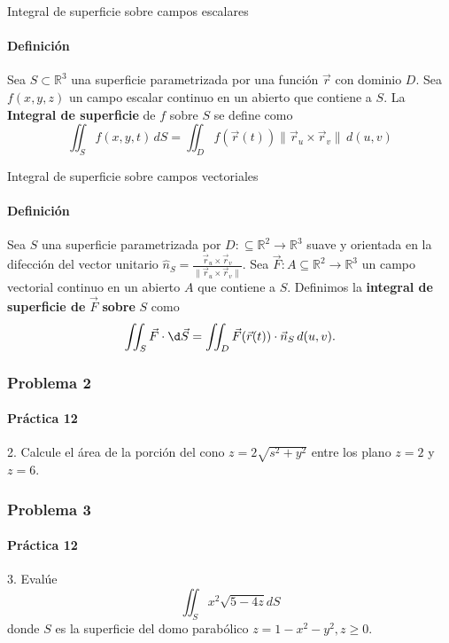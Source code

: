 \documentclass{plantillaPPT}
\begin{document}
\begin{frame}{Integral de superficie sobre campos escalares}
\framesubtitle{Definición}
\begin{definicion}
    Sea $S\subset\mathbb{R}^3$ una superficie parametrizada por una función $\vec{r}$ con dominio $D$. Sea $f(x,y,z)$ un campo escalar continuo en un abierto que contiene a $S$. La \textbf{Integral de superficie} de $f$ sobre $S$ se define como
    \begin{equation*}
        \iint_Sf(x,y,t)\,dS = \iint_Df(\vec{r}(t)) \|\vec{r}_u \times\vec{r}_v\|\,d(u,v)
    \end{equation*}
\end{definicion}
\end{frame}

\begin{frame}{Integral de superficie sobre campos vectoriales}
\framesubtitle{Definición}
\begin{definicion}
    Sea $S$ una superficie parametrizada por $D:\subseteq\mathbb{R}^2\to\mathbb{R}^3$ suave y orientada en la difección del vector unitario $\displaystyle\hat{n}_S = \frac{\vec{r}_u\times\vec{r}_v}{\|\vec{r}_u\times\vec{r}_v\|}$. Sea $\vec{F}:A\subseteq\mathbb{R}^2\to\mathbb{R}^3$ un campo vectorial continuo en un abierto $A$ que contiene a $S$. Definimos la \textbf{integral de superficie de }$\vec{F}$\textbf{ sobre} $S$ como
    \begin{equation*}
        \iint_S\vec{F}\cdot\d\vec{S} = \iint_D \vec{F}(\vec{r}(t)) \cdot \vec{n}_S\,d(u,v).
    \end{equation*}
\end{definicion}
\end{frame}

\begin{frame}
    \frametitle{Problema 2}
    \framesubtitle{Práctica 12}
    2. Calcule el área de la porción del cono $z=2\sqrt{s^2+y^2}$ entre los plano $z=2$ y $z=6$.
\end{frame}

\begin{frame}
    \frametitle{Problema 3}
    \framesubtitle{Práctica 12}
    3. Evalúe
    \begin{equation*}
        \iint_S x^2\sqrt{5-4z}dS
    \end{equation*}
    donde $S$ es la superficie del domo parabólico $z=1-x^2-y^2, z\geq0$.
\end{frame}
\end{document}

